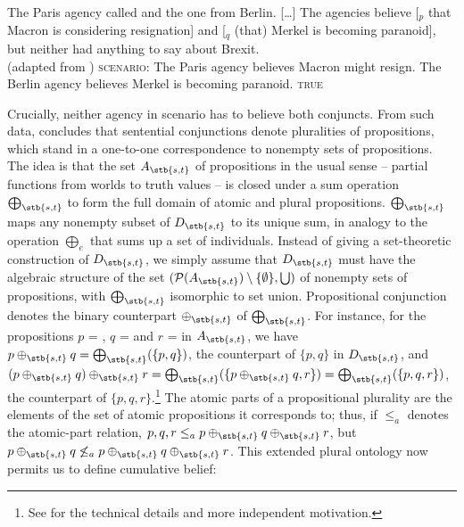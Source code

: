 \documentclass[output=paper]{langscibook}
\begin{document}
\eanoraggedright
\eanoraggedright \label{sch-has:ex:24} The Paris agency called and the one from Berlin. [\ldots] The agencies believe [$_p$ that Macron is considering resignation] and [$_q$ (that) Merkel is becoming paranoid], but neither had anything to say about Brexit.\\\null\hfill (adapted from \citealt[(18)]{Schmitt:2019})%
\ex \label{sch-has:ex:25} \textsc{scenario:} The Paris agency believes Macron might resign. The Berlin agency believes  Merkel is becoming paranoid.  \hfill {} \textsc{true}\z\z



\noindent Crucially, neither agency in scenario  has to believe both conjuncts. From such data, \citet{Schmitt:2019} concludes that sentential conjunctions denote pluralities of propositions, which stand in a one-to-one correspondence to nonempty sets of propositions. The idea is that the set $A_{\stb{s, t}}$ of propositions in the usual sense -- partial functions from worlds to truth values -- is closed under a sum operation $\bigoplus_{\stb{s, t}}$ to form the full domain of atomic and plural propositions. $\bigoplus_{\stb{s, t}}$ maps any nonempty subset of $D_{\stb{s, t}}$ to its unique sum, in analogy to the operation $\bigoplus_{e}$ that sums up a set of individuals. Instead of giving a set-theoretic construction of $D_{\stb{s, t}}$, we simply assume that $D_{\stb{s, t}}$ must have the algebraic structure of the set $(\mathcal{P}(A_{\stb{s, t}}) \setminus \{\emptyset\}, \bigcup)$ of nonempty sets of propositions, with $\bigoplus_{\stb{s, t}}$ isomorphic to set union. Propositional conjunction denotes the binary counterpart $\oplus_{\stb{s, t}}$ of $\bigoplus_{\stb{s, t}}$. For instance, for the propositions $p$ = , $q$ =  and $r$ =  in $A_{\stb{s, t}}$, we have $p \oplus_{\stb{s, t}} q = \bigoplus_{\stb{s, t}}(\{p, q\})$, the counterpart of $\{p, q\}$ in $D_{\stb{s, t}}$, and $(p \oplus_{\stb{s, t}} q) \oplus_{\stb{s, t}} r = \bigoplus_{\stb{s, t}}(\{p \oplus_{\stb{s, t}} q, r\}) = \bigoplus_{\stb{s, t}}(\{p, q, r\})$, the counterpart of $\{p, q, r\}$.\footnote{See \citet{Schmitt:2019a} for the technical details and more independent motivation.} The atomic parts of a propositional plurality are the elements of the set of atomic propositions it corresponds to; thus, if $\leq_a$ denotes the atomic-part relation, $p, q, r \leq_a p \oplus_{\stb{s, t}} q \oplus_{\stb{s, t}} r$, but $p \oplus_{\stb{s, t}} q \not\leq_a p \oplus_{\stb{s, t}} q \oplus_{\stb{s, t}} r$. This extended plural ontology now permits us to define cumulative belief:
\end{document}
